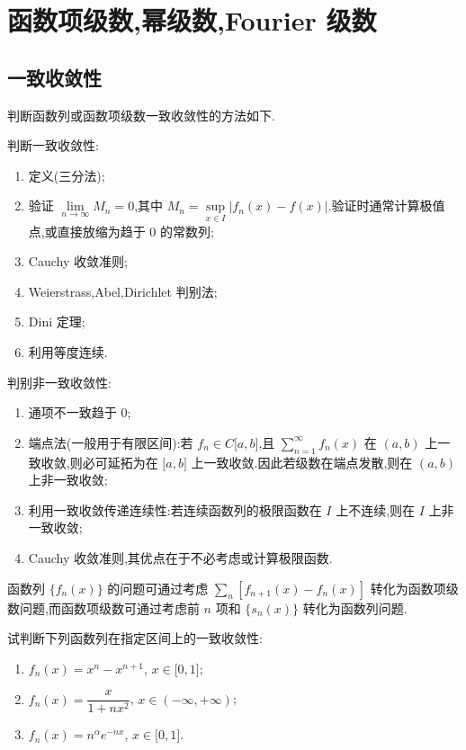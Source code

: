 \setcounter{chapter}{8}
\pagestyle{fancy}

\chapter{函数项级数,幂级数,Fourier 级数}


\section{一致收敛性}

判断函数列或函数项级数一致收敛性的方法如下.

判断一致收敛性:
\begin{enumerate}
    \item 定义(三分法);
    \item 验证 $\displaystyle\lim\limits_{n\to\infty}M_n=0$,其中
          $M_n=\displaystyle\sup\limits_{x\in I}|f_n(x)-f(x)|$.验证时通常计算极值点,或直接放缩为趋于 $0$ 的常数列;
    \item Cauchy 收敛准则;
    \item Weierstrass,Abel,Dirichlet 判别法;
    \item Dini 定理;
    \item 利用等度连续.
\end{enumerate}

判别非一致收敛性:
\begin{enumerate}
    \item 通项不一致趋于 $0$;
    \item 端点法(一般用于有限区间):若 $f_n\in C\lbrack a,b\rbrack$,且 $\displaystyle\sum\limits_{n=1}^{\infty}f_n(x)$ 在 $(a,b)$ 上一致收敛,则必可延拓为在 $\lbrack a,b\rbrack$ 上一致收敛.因此若级数在端点发散,则在 $(a,b)$ 上非一致收敛;
    \item 利用一致收敛传递连续性:若连续函数列的极限函数在 $I$ 上不连续,则在 $I$ 上非一致收敛;
    \item Cauchy 收敛准则,其优点在于不必考虑或计算极限函数.
\end{enumerate}

\begin{remark}
    函数列 $\{f_n(x)\}$ 的问题可通过考虑 $\displaystyle\sum\limits_n[f_{n+1}(x)-f_n(x)]$ 转化为函数项级数问题,而函数项级数可通过考虑前 $n$ 项和 $\{s_n(x)\}$ 转化为函数列问题.
\end{remark}

\begin{example}
    试判断下列函数列在指定区间上的一致收敛性:
    \begin{enumerate}
        \item $f_n(x)=x^n-x^{n+1}$, $x\in\lbrack 0,1\rbrack$;
        \item $f_n(x)=\dfrac{x}{1+nx^2}$, $x\in(-\infty,+\infty)$;
        \item $f_n(x)=n^\alpha e^{-nx}$, $x\in\lbrack 0,1\rbrack$.
    \end{enumerate}
\end{example}
\exampleblank

